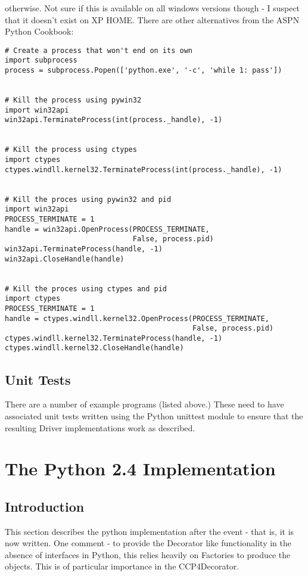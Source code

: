 \documentclass[a4paper, 11pt]{article}
\begin{document}
\noindent
otherwise. Not sure if this is available on all windows versions though - I 
suspect that it doesn't exist on XP HOME. There are other alternatives
from the ASPN Python Cookbook:

\begin{verbatim}
# Create a process that won't end on its own
import subprocess
process = subprocess.Popen(['python.exe', '-c', 'while 1: pass'])


# Kill the process using pywin32
import win32api
win32api.TerminateProcess(int(process._handle), -1)


# Kill the process using ctypes
import ctypes
ctypes.windll.kernel32.TerminateProcess(int(process._handle), -1)


# Kill the proces using pywin32 and pid
import win32api
PROCESS_TERMINATE = 1
handle = win32api.OpenProcess(PROCESS_TERMINATE, 
                              False, process.pid)
win32api.TerminateProcess(handle, -1)
win32api.CloseHandle(handle)


# Kill the proces using ctypes and pid
import ctypes
PROCESS_TERMINATE = 1
handle = ctypes.windll.kernel32.OpenProcess(PROCESS_TERMINATE, 
                                            False, process.pid)
ctypes.windll.kernel32.TerminateProcess(handle, -1)
ctypes.windll.kernel32.CloseHandle(handle)
\end{verbatim}


\subsection{Unit Tests}

There are a number of example programs (listed above.) These need to have 
associated unit tests written using the Python unittest module to ensure
that the resulting Driver implementations work as described.

\section{The Python 2.4 Implementation}

\subsection{Introduction}

This section describes the python implementation after the event - that is,
it is now written. One comment - to provide the Decorator like functionality
in the absence of interfaces in Python, this relies heavily on Factories
to produce the objects. This is of particular importance in the CCP4Decorator.
\end{document}
